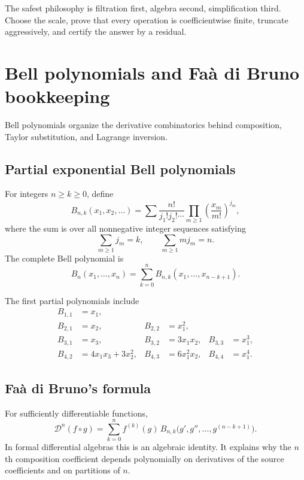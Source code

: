 \documentclass[11pt,oneside]{book}
\theoremstyle{definition}
\theoremstyle{remark}
\newcommand{\D}{\mathcal D}
\newcommand{\compose}{\mathbin{\circ}}
\begin{document}
\begin{summarybox}
The safest philosophy is filtration first, algebra second, simplification
third. Choose the scale, prove that every operation is coefficientwise
finite, truncate aggressively, and certify the answer by a residual.
\end{summarybox}


\appendix

\chapter{Bell polynomials and Fa\`a di Bruno bookkeeping}
\label{app:bell}

Bell polynomials organize the derivative combinatorics behind composition,
Taylor substitution, and Lagrange inversion.

\section{Partial exponential Bell polynomials}
For integers $n\ge k\ge0$, define
\begin{equation}\label{eq:bell-definition}
 B_{n,k}(x_1,x_2,\ldots)
 =
 \sum
 \frac{n!}{j_1!j_2!\cdots}
 \prod_{m\ge1}\left(\frac{x_m}{m!}\right)^{j_m},
\end{equation}
where the sum is over all nonnegative integer sequences satisfying
\[
 \sum_{m\ge1}j_m=k,\qquad
 \sum_{m\ge1}m j_m=n.
\]
The complete Bell polynomial is
\[
 B_n(x_1,\ldots,x_n)=\sum_{k=0}^nB_{n,k}(x_1,\ldots,x_{n-k+1}).
\]

The first partial polynomials include
\begin{align*}
 B_{1,1}&=x_1,\\
 B_{2,1}&=x_2,&B_{2,2}&=x_1^2,\\
 B_{3,1}&=x_3,&B_{3,2}&=3x_1x_2,&B_{3,3}&=x_1^3,\\
 B_{4,2}&=4x_1x_3+3x_2^2,&
 B_{4,3}&=6x_1^2x_2,&B_{4,4}&=x_1^4.
\end{align*}

\section{Fa\`a di Bruno's formula}
For sufficiently differentiable functions,
\begin{equation}\label{eq:faa-di-bruno}
 \D^n(f\compose g)
 =
 \sum_{k=0}^{n}
 f^{(k)}(g)\,
 B_{n,k}\bigl(g',g'',\ldots,g^{(n-k+1)}\bigr).
\end{equation}
In formal differential algebras this is an algebraic identity. It explains
why the $n$th composition coefficient depends polynomially on derivatives
of the source coefficients and on partitions of $n$.
\end{document}
